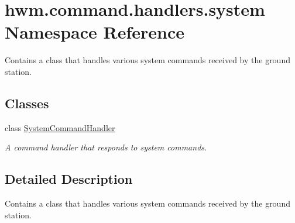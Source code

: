 \hypertarget{namespacehwm_1_1command_1_1handlers_1_1system}{\section{hwm.\-command.\-handlers.\-system Namespace Reference}
\label{namespacehwm_1_1command_1_1handlers_1_1system}
}


Contains a class that handles various system commands received by the ground station.  


\subsection*{Classes}
\begin{DoxyCompactItemize}
\item 
class \hyperlink{classhwm_1_1command_1_1handlers_1_1system_1_1_system_command_handler}{System\-Command\-Handler}
\begin{DoxyCompactList}\small\item\em A command handler that responds to system commands. \end{DoxyCompactList}\end{DoxyCompactItemize}


\subsection{Detailed Description}
Contains a class that handles various system commands received by the ground station. 